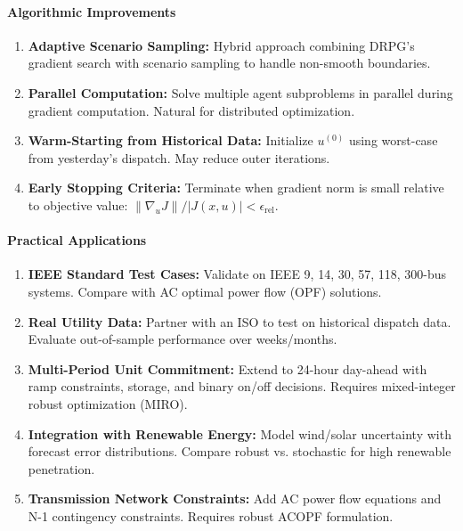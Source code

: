 \paragraph{Algorithmic Improvements}

\begin{enumerate}
    \item \textbf{Adaptive Scenario Sampling:} Hybrid approach combining DRPG's gradient search with scenario sampling to handle non-smooth boundaries.

    \item \textbf{Parallel Computation:} Solve multiple agent subproblems in parallel during gradient computation. Natural for distributed optimization.

    \item \textbf{Warm-Starting from Historical Data:} Initialize $u^{(0)}$ using worst-case from yesterday's dispatch. May reduce outer iterations.

    \item \textbf{Early Stopping Criteria:} Terminate when gradient norm is small relative to objective value: $\|\nabla_u J\| / |J(x, u)| < \epsilon_{\text{rel}}$.
\end{enumerate}

\paragraph{Practical Applications}

\begin{enumerate}
    \item \textbf{IEEE Standard Test Cases:} Validate on IEEE 9, 14, 30, 57, 118, 300-bus systems. Compare with AC optimal power flow (OPF) solutions.

    \item \textbf{Real Utility Data:} Partner with an ISO to test on historical dispatch data. Evaluate out-of-sample performance over weeks/months.

    \item \textbf{Multi-Period Unit Commitment:} Extend to 24-hour day-ahead with ramp constraints, storage, and binary on/off decisions. Requires mixed-integer robust optimization (MIRO).

    \item \textbf{Integration with Renewable Energy:} Model wind/solar uncertainty with forecast error distributions. Compare robust vs. stochastic for high renewable penetration.

    \item \textbf{Transmission Network Constraints:} Add AC power flow equations and N-1 contingency constraints. Requires robust ACOPF formulation.
\end{enumerate}

